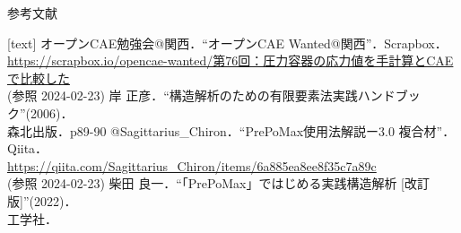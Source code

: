 \begin{frame}{参考文献}
  \begin{thebibliography}{9}
     [text]
      オープンCAE勉強会@関西．“オープンCAE Wanted@関西”．Scrapbox． \\
         {\scriptsize \fontsize{10pt}{10pt}  \color{cud_orange}
          \url{https://scrapbox.io/opencae-wanted/第76回：圧力容器の応力値を手計算とCAEで比較した}} \\
          (参照 2024-02-23)
      岸 正彦．“構造解析のための有限要素法実践ハンドブック”(2006)．\\
	  森北出版．p89-90
      @Sagittarius\_Chiron．“PrePoMax使用法解説ー3.0 複合材”．Qiita．\\
           {\footnotesize {} \color{cud_orange}
           \url{https://qiita.com/Sagittarius_Chiron/items/6a885ea8ee8f35c7a89c}} \\
           (参照 2024-02-23)
      柴田 良一．“「PrePoMax」ではじめる実践構造解析 [改訂版]”(2022)．\\ 工学社．
  \end{thebibliography}
\end{frame}
